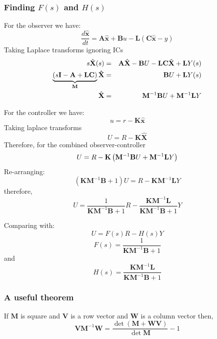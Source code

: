 
\ifslidesonly
\begin{slide}
   
\end{slide}
\fi



\subsubsection*{Finding $F(s)$ and $H(s)$} %
\label{ssub:finding_f_s_and_h_s_}

For the observer we have:
\[
\frac{d\hat{\mathbf{x}}}{dt} = \mathbf{A}\hat{\mathbf{x}}+\mathbf{B}u-\mathbf{L}(\mathbf{C}\hat{\mathbf{x}} - y)
\]
Taking Laplace transforms ignoring ICs
\begin{eqnarray*}
s\hat{\mathbf{X}}(s) & = & \mathbf{A}\hat{\mathbf{X}} - \mathbf{B}U - \mathbf{LC}\hat{\mathbf{X}} + \mathbf{L}Y(s) \\	
\underbrace {(s{\bf{I}} - {\bf{A}} + {\bf{LC}})}_{{\bf{M}}}{\bf{\hat X}} & = & {\bf B}U + {\bf{L}}Y(s) \\
\hat{\mathbf{X}} & = & \mathbf{M}^{-1}\mathbf{B}U + \mathbf{M}^{-1}{\bf{L}}Y
\end{eqnarray*}

For the controller we have:
\[
u = r - \mathbf{K}\hat{\mathbf{x}}
\]
Taking laplace transforms
\[
U = R - \mathbf{K}\hat{\mathbf{X}}
\]
Therefore, for the combined observer-controller
\[
U=R-\mathbf{K}\left(\mathbf{M}^{-1}\mathbf{B}U + \mathbf{M}^{-1}{\bf{L}}Y\right)
\]
Re-arranging:
\[
\left(\mathbf{KM}^{-1}\mathbf{B}+1\right)U=R-\mathbf{KM}^{-1}\mathbf{L}Y
\]
therefore,
\[
U=\frac{1}{\mathbf{KM}^{-1}\mathbf{B}+1}R-\frac{\mathbf{KM}^{-1}\mathbf{L}}{\mathbf{KM}^{-1}\mathbf{B}+1}Y
\]

Comparing with: $$U=F(s)R-H(s)Y$$
\[
F(s) = \frac{1}{\mathbf{KM}^{-1}\mathbf{B}+1}
\]
and
\[
H(s) = \frac{\mathbf{KM}^{-1}\mathbf{L}}{\mathbf{KM}^{-1}\mathbf{B}+1}
\]


 

\subsubsection*{A useful theorem} %
\label{ssub:a_useful_theorem}

If $\mathbf{M}$ is square and $\mathbf{V}$ is a row vector and $\mathbf{W}$ is a column vector then,
\[
\mathbf{VM}^{-1}\mathbf{W}=\frac{\det\left(\mathbf{M}+\mathbf{WV}\right)}{\det{\mathbf{M}}}-1
\]
 

